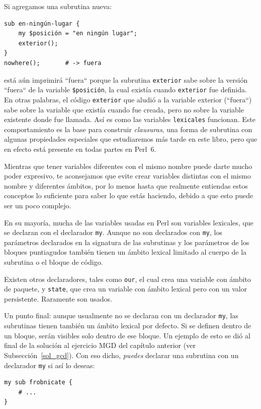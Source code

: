 Si agregamos una subrutina nueva:
\begin{lstlisting}
sub en-ningún-lugar {
    my $posición = "en ningún lugar";
    exterior();
}
nowhere();       # -> fuera
\end{lstlisting}
% 
está aún imprimirá ``fuera`` porque la subrutina {\tt exterior}
sabe sobre la versión ``fuera`` de la variable {\tt \$posición},
la cual existía cuando {\tt exterior} fue definida. En otras palabras,
el código {\tt exterior} que aludió a la variable exterior (``fuera``) 
sabe sobre la variable que existía cuando fue creada, pero no sobre la 
variable existente donde fue llamada. Así es como las variables 
{\tt lexicales} funcionan. Este comportamiento es la base para construir 
\emph{clausuras}, una forma de subrutina con algunas propiedades especiales
que estudiaremos más tarde en este libro, pero que en efecto está 
presente en todas partes en Perl~6.

Mientras que tener variables diferentes con el mismo nombre
puede darte mucho poder expresivo, te aconsejamos que evite 
crear variables distintas con el mismo nombre y diferentes 
ámbitos, por lo menos hasta que realmente entiendas estos 
conceptos lo suficiente para saber lo que estás haciendo, debido
a que esto puede ser un poco complejo.

En su mayoría, mucha de las variables usadas en Perl son variables
lexicales, que se declaran con el declarador {\tt my}. Aunque no son 
declarados con {\tt my}, los parámetros declarados en la 
signatura de las subrutinas y los parámetros de los bloques
puntiagudos también tienen un ámbito lexical limitado al cuerpo de
la subrutina o el bloque de código.

Existen otros declaradores, tales como {\tt our}, el cual crea
una variable con ámbito de paquete, y {\tt state}, que crea
un variable con ámbito lexical pero con un valor persistente.
Raramente son usados.

Un punto final: aunque usualmente no se declaran con 
un declarador {\tt my}, las subrutinas tienen también
un ámbito lexical por defecto. Si se definen dentro de un bloque,
serán visibles solo dentro de ese bloque. Un ejemplo de esto
se dió al final de la solución al ejercicio MGD del capítulo anterior
(ver Subsección~\ref{sol_gcd}). Con eso dicho, \emph{puedes} declarar
una subrutina con un declarador {\tt my} si así lo deseas:

\begin{lstlisting}
my sub frobnicate { 
    # ... 
}
\end{lstlisting}


